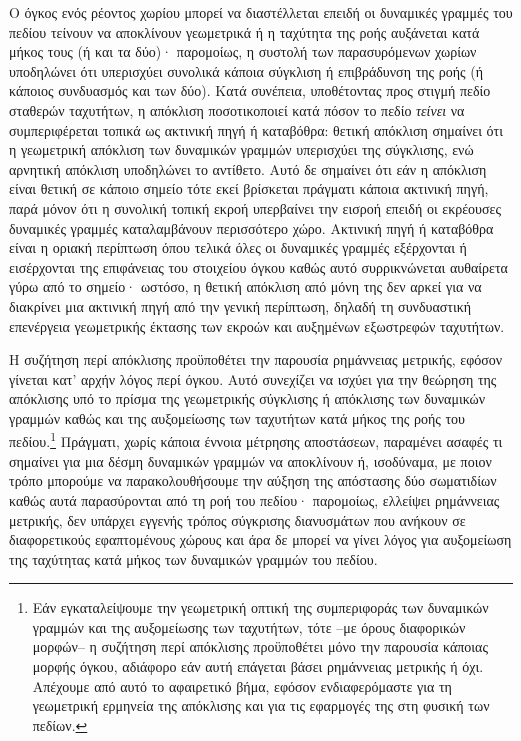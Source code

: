 \documentclass[10pt,a4paper,twoside,openany]{book}
\theoremstyle{plain}
\theoremstyle{definition}
\theoremstyle{remark}
\numberwithin{equation}{section}
\begin{document}
Ο όγκος ενός ρέοντος χωρίου μπορεί να διαστέλλεται
επειδή οι δυναμικές γραμμές του πεδίου τείνουν να αποκλίνουν γεωμετρικά
ή η ταχύτητα της ροής αυξάνεται κατά μήκος τους
(ή και τα δύο)· παρομοίως, η συστολή των παρασυρόμενων χωρίων
υποδηλώνει ότι υπερισχύει συνολικά κάποια σύγκλιση ή επιβράδυνση της ροής
(ή κάποιος συνδυασμός και των δύο).
Κατά συνέπεια, υποθέτοντας προς στιγμή πεδίο σταθερών ταχυτήτων,
η απόκλιση ποσοτικοποιεί κατά πόσον το πεδίο
\textit{τείνει} να συμπεριφέρεται τοπικά ως ακτινική πηγή ή καταβόθρα:
θετική απόκλιση σημαίνει ότι η γεωμετρική απόκλιση των δυναμικών γραμμών
υπερισχύει της σύγκλισης, ενώ αρνητική απόκλιση υποδηλώνει το αντίθετο.
Αυτό δε σημαίνει ότι εάν η απόκλιση είναι θετική σε κάποιο σημείο
τότε εκεί βρίσκεται πράγματι κάποια ακτινική πηγή,
παρά μόνον ότι η συνολική τοπική εκροή υπερβαίνει την εισροή
επειδή οι εκρέουσες δυναμικές γραμμές καταλαμβάνουν περισσότερο χώρο.
Ακτινική πηγή ή καταβόθρα είναι η οριακή περίπτωση όπου τελικά
όλες οι δυναμικές γραμμές εξέρχονται ή εισέρχονται
της επιφάνειας του στοιχείου όγκου καθώς αυτό
συρρικνώνεται αυθαίρετα γύρω από το σημείο·
ωστόσο, η θετική απόκλιση από μόνη της δεν αρκεί για να διακρίνει
μια ακτινική πηγή από την γενική περίπτωση,
δηλαδή τη συνδυαστική επενέργεια γεωμετρικής έκτασης των εκροών
και αυξημένων εξωστρεφών ταχυτήτων.

Η συζήτηση περί απόκλισης προϋποθέτει την παρουσία ρημάννειας μετρικής,
εφόσον γίνεται κατ' αρχήν λόγος περί όγκου.
Αυτό συνεχίζει να ισχύει για την θεώρηση της απόκλισης
υπό το πρίσμα της γεωμετρικής σύγκλισης ή απόκλισης των δυναμικών γραμμών
καθώς και της αυξομείωσης των ταχυτήτων
κατά μήκος της ροής του πεδίου.\footnote{Εάν εγκαταλείψουμε
την γεωμετρική οπτική της συμπεριφοράς
των δυναμικών γραμμών και της αυξομείωσης των ταχυτήτων,
τότε --με όρους διαφορικών μορφών--
η συζήτηση περί απόκλισης προϋποθέτει μόνο την παρουσία κάποιας μορφής όγκου,
αδιάφορο εάν αυτή επάγεται βάσει ρημάννειας μετρικής ή όχι.
Απέχουμε από αυτό το αφαιρετικό βήμα, εφόσον ενδιαφερόμαστε
για τη γεωμετρική ερμηνεία της απόκλισης
και για τις εφαρμογές της στη φυσική των πεδίων.}
Πράγματι, χωρίς κάποια έννοια μέτρησης αποστάσεων,
παραμένει ασαφές τι σημαίνει για μια δέσμη δυναμικών γραμμών
να αποκλίνουν
ή, ισοδύναμα, με ποιον τρόπο μπορούμε να παρακολουθήσουμε
την αύξηση της απόστασης δύο σωματιδίων
καθώς αυτά παρασύρονται από τη ροή του πεδίου·
παρομοίως, ελλείψει ρημάννειας μετρικής,
δεν υπάρχει εγγενής τρόπος σύγκρισης διανυσμάτων που ανήκουν
σε διαφορετικούς εφαπτομένους χώρους και άρα
δε μπορεί να γίνει λόγος για αυξομείωση της ταχύτητας
κατά μήκος των δυναμικών γραμμών του πεδίου.
\end{document}

